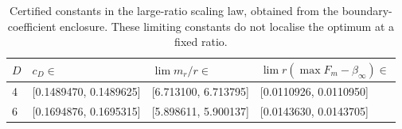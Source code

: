 \begin{table}[htbp]
\centering
\caption{Certified constants in the large-ratio scaling law, obtained from the boundary-coefficient enclosure. These limiting constants do not localise the optimum at a fixed ratio.}
\label{tab:coupled_scale}
\begin{tabular}{llll}
\toprule
$D$ & $c_D\in$ & $\lim m_r/r\in$ & $\lim r(\max F_m-\beta_\infty)\in$ \\
\midrule
4 & [0.1489470, 0.1489625] & [6.713100, 6.713795] & [0.0110926, 0.0110950] \\
6 & [0.1694876, 0.1695315] & [5.898611, 5.900137] & [0.0143630, 0.0143705] \\
\bottomrule
\end{tabular}
\end{table}
